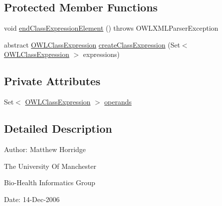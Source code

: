 \subsection*{Protected Member Functions}
\begin{DoxyCompactItemize}
\item 
void \hyperlink{classorg_1_1coode_1_1owlapi_1_1owlxmlparser_1_1_abstract_nary_boolean_class_expression_element_handler_a21b6b5a5de210dbe8db1bc7953b35053}{end\-Class\-Expression\-Element} ()  throws O\-W\-L\-X\-M\-L\-Parser\-Exception 
\item 
abstract \hyperlink{interfaceorg_1_1semanticweb_1_1owlapi_1_1model_1_1_o_w_l_class_expression}{O\-W\-L\-Class\-Expression} \hyperlink{classorg_1_1coode_1_1owlapi_1_1owlxmlparser_1_1_abstract_nary_boolean_class_expression_element_handler_aafc98cc6be13b6dffa43fd4b92869407}{create\-Class\-Expression} (Set$<$ \hyperlink{interfaceorg_1_1semanticweb_1_1owlapi_1_1model_1_1_o_w_l_class_expression}{O\-W\-L\-Class\-Expression} $>$ expressions)
\end{DoxyCompactItemize}
\subsection*{Private Attributes}
\begin{DoxyCompactItemize}
\item 
Set$<$ \hyperlink{interfaceorg_1_1semanticweb_1_1owlapi_1_1model_1_1_o_w_l_class_expression}{O\-W\-L\-Class\-Expression} $>$ \hyperlink{classorg_1_1coode_1_1owlapi_1_1owlxmlparser_1_1_abstract_nary_boolean_class_expression_element_handler_a9d005ffcc6e7dac31391c38dd5e0e750}{operands}
\end{DoxyCompactItemize}


\subsection{Detailed Description}
Author\-: Matthew Horridge\par
 The University Of Manchester\par
 Bio-\/\-Health Informatics Group\par
 Date\-: 14-\/\-Dec-\/2006\par
\par
 

